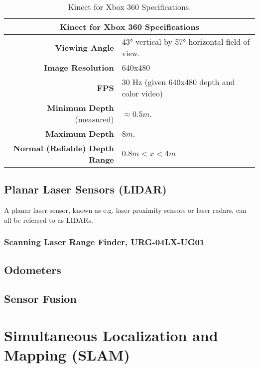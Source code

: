 \begin{table}
	\centering
	\begin{tabular}{ r | p{6.8cm} }
		\hline
		\multicolumn{2}{c}{Kinect for Xbox 360 Specifications}\\
		\hline
		\textbf{Viewing Angle} & 43° vertical by 57° horizontal field of view. \\
		\hline
		\textbf{Image Resolution} & 640x480 \\
		\hline
		\textbf{FPS} & 30 Hz (given 640x480 depth and color video)\\
		\hline
		\textbf{Minimum Depth} (measured) & $\approx 0.5m$.\\
		\hline
		\textbf{Maximum Depth} & $8 m$.\\
		\hline
		\textbf{Normal (Reliable) Depth Range} & $0.8m < x < 4m$\\
		\hline\hline
	\end{tabular}
	\caption{Kinect for Xbox 360 Specifications.}\label{tab:kinect}
\end{table}




\subsection{Planar Laser Sensors (LIDAR)}

A planar laser sensor, known as e.g. laser proximity sensors or laser radars, can all be referred to as LIDARs. 

\subsubsection{Scanning Laser Range Finder, URG-04LX-UG01}


\subsection{Odometers}

\subsection{Sensor Fusion}


\section{Simultaneous Localization and Mapping (SLAM)}

